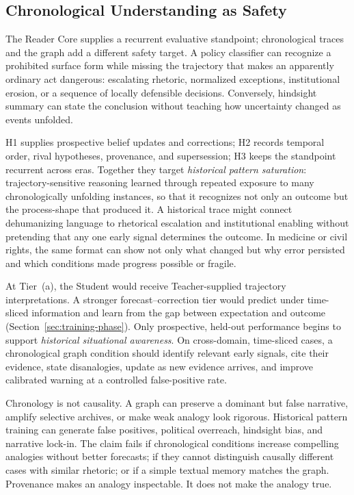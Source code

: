 \subsection{Chronological Understanding as Safety}\label{sec:chronological-safety}

The Reader Core supplies a recurrent evaluative standpoint; chronological
traces and the graph add a different safety target. A policy classifier can
recognize a prohibited surface form while missing the trajectory that makes an
apparently ordinary act dangerous: escalating rhetoric, normalized exceptions,
institutional erosion, or a sequence of locally defensible decisions.
Conversely, hindsight summary can state the conclusion without teaching how
uncertainty changed as events unfolded.

H1 supplies prospective belief updates and corrections; H2 records temporal
order, rival hypotheses, provenance, and supersession; H3 keeps the standpoint
recurrent across eras. Together they target \emph{historical pattern
saturation}: trajectory-sensitive reasoning learned through repeated exposure
to many chronologically unfolding instances, so that it recognizes not only an
outcome but the process-shape that produced it. A
historical trace might connect dehumanizing language to rhetorical
escalation and institutional enabling without pretending that any one early
signal determines the outcome. In medicine or civil rights, the same format can
show not only what changed but why error persisted and which conditions made
progress possible or fragile.

At Tier~(a), the Student would receive Teacher-supplied trajectory
interpretations. A stronger forecast--correction tier would predict under
time-sliced information and learn from the gap between expectation and outcome
(Section~\ref{sec:training-phase}). Only prospective, held-out performance
begins to support \emph{historical situational awareness}. On cross-domain,
time-sliced cases, a chronological graph condition should identify relevant
early signals, cite their evidence, state disanalogies, update as new evidence
arrives, and improve calibrated warning at a controlled false-positive rate.

Chronology is not causality. A graph can preserve a dominant but false
narrative, amplify selective archives, or make weak analogy look rigorous.
Historical pattern training can generate false positives, political overreach,
hindsight bias, and narrative lock-in. The claim fails if chronological
conditions increase compelling analogies without better forecasts; if they
cannot distinguish causally different cases with similar rhetoric; or if a
simple textual memory matches the graph. Provenance makes an analogy
inspectable. It does not make the analogy true.


